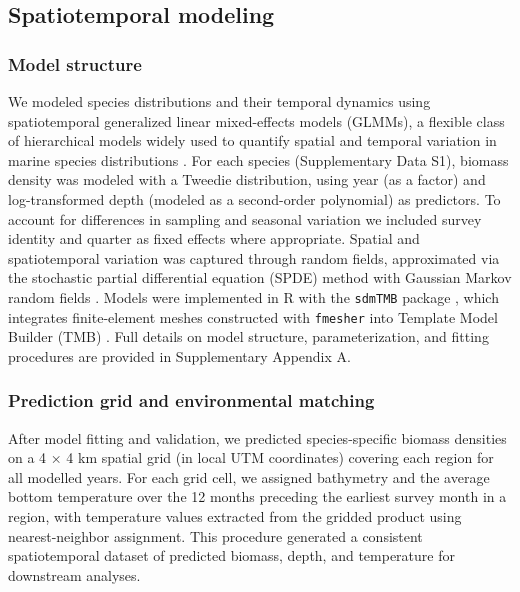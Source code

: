 \documentclass[9pt,twocolumn,twoside]{pnas-new}
\begin{document}
{\subsection*{Spatiotemporal modeling}\label{sec:Species spatiotemporal modeling}

\subsubsection*{Model structure} 
We modeled species distributions and their temporal dynamics using spatiotemporal generalized linear mixed-effects models (GLMMs), a flexible class of hierarchical models widely used to quantify spatial and temporal variation in marine species distributions \citep{thorson_geostatistical_2015, thorson_model-based_2016}. For each species (Supplementary Data S1), biomass density was modeled with a Tweedie distribution, using year (as a factor) and log-transformed depth (modeled as a second-order polynomial) as predictors. To account for differences in sampling and seasonal variation we included survey identity and quarter as fixed effects where appropriate. Spatial and spatiotemporal variation was captured through random fields, approximated via the stochastic partial differential equation (SPDE) method with Gaussian Markov random fields \citep{lindgren_explicit_2011}. Models were implemented in R with the \texttt{sdmTMB} package \citep{sdmTMB2025}, which integrates finite-element meshes constructed with \texttt{fmesher} \citep{lindgren_fmesher_2025} into Template Model Builder (TMB) \citep{kristensen_tmb_2016}. Full details on model structure, parameterization, and fitting procedures are provided in Supplementary Appendix A.

\subsubsection*{Prediction grid and environmental matching} 
After model fitting and validation, we predicted species-specific biomass densities on a 4 × 4 km spatial
grid (in local UTM coordinates) covering each region for all modelled years. For each grid cell, we assigned bathymetry and the average bottom temperature over the 12 months preceding the earliest survey month in a region, with temperature values extracted from the gridded product using nearest-neighbor assignment. This procedure generated a consistent spatiotemporal dataset of predicted biomass, depth, and temperature for downstream analyses.

}
\end{document}
